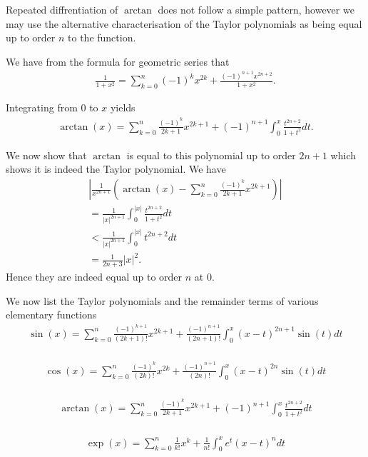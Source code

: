 \documentclass[]{article}
\begin{document}
Repeated diffrentiation of $\arctan$ does not follow a simple pattern, however we may use the alternative characterisation of the Taylor polynomials as being equal up to order $n$ to the function.

We have from the formula for geometric series that
\begin{align*}
		\frac{1}{1+x^2} = \sum_{k=0}^n (-1)^k x^{2k} + \frac{(-1)^{n+1}x^{2n+2}}{1+x^2}.
\end{align*}

Integrating from $0$ to $x$ yields
\begin{align*}
		\arctan(x) = \sum_{k=0}^n \frac{(-1)^k}{2k+1} x^{2k+1} + (-1)^{n+1} \int_0^x \frac{t^{2n+2}}{1+t^2} dt.
\end{align*}

We now show that $\arctan$ is equal to this polynomial up to order $2n+1$ which shows it is indeed the Taylor polynomial. We have
\begin{align*}
		\left|\frac{1}{x^{2n+1}} (\arctan(x) - \sum_{k=0}^n \frac{(-1)^k}{2k+1} x^{2k+1})\right| \\
		= \frac{1}{|x|^{2n+1}} \int_0^{|x|} \frac{t^{2n+2}}{1+t^2}dt \\
		< \frac{1}{|x|^{2n+1}}\int_0^{|x|} t^{2n+2} dt \\
		= \frac{1}{2n+3} |x|^2.
\end{align*}
Hence they are indeed equal up to order $n$ at $0$. 

We now list the Taylor polynomials and the remainder terms of various elementary functions
\begin{align*}
	\sin(x) = \sum_{k=0}^n \frac{(-1)^{k+1}}{(2k+1)!} x^{2k+1} + \frac{(-1)^{n+1}}{(2n+1)!}\int_0^x (x-t)^{2n+1} \sin(t) dt \\
\end{align*}

\begin{align*}
	\cos(x) = \sum_{k=0}^n \frac{(-1)^k}{(2k)!} x^{2k} + \frac{(-1)^{n+1}}{(2n)!} \int_0^x (x-t)^{2n} \sin(t) dt \\
\end{align*}

\begin{align*}
	\arctan(x) = \sum_{k=0}^n \frac{(-1)^k}{2k+1} x^{2k+1} + (-1)^{n+1} \int_0^x \frac{t^{2n+2}}{1+t^2} dt \\
\end{align*}

\begin{align*}
	\exp(x) = \sum_{k=0}^n \frac{1}{k!}x^k + \frac{1}{n!}\int_0^x e^t (x-t)^n dt \\
\end{align*}
\end{document}
